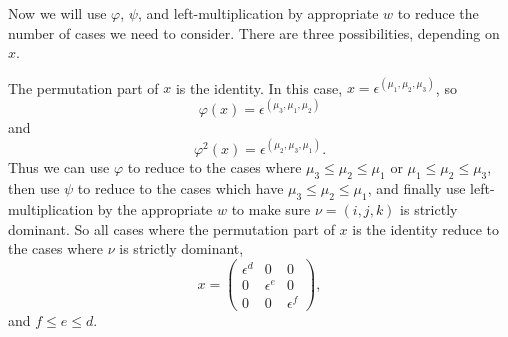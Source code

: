 \documentclass{amsart}
\theoremstyle{definition}
\def\e{\epsilon}
\def\phi{\varphi}
\newenvironment{caselist}
	       {\begin{list}{\underline{Case \arabic{enumi}}:}
		   {\usecounter{enumi}
		     \setlength{\itemindent}{0.5in}
		     \setlength{\leftmargin}{0in}
		     \setlength{\rightmargin}{0in}
	       }}
	       {\end{list}}
\begin{document}
  Now we will use $\phi$, $\psi$, and left-multiplication by appropriate $w$ to
  reduce the number of cases we need to consider.  There are three
  possibilities, depending on $x$.
  \begin{caselist}
    \item The permutation part of $x$ is the identity.  In this case, $x =
      \e^{(\mu_1,\mu_2,\mu_3)}$, so
      \begin{equation*}
        \phi(x) = \e^{(\mu_3, \mu_1, \mu_2)}
      \end{equation*}
      and
      \begin{equation*}
        \phi^2(x) = \e^{(\mu_2, \mu_3, \mu_1)}.
      \end{equation*}
      Thus we can use $\phi$ to reduce to the cases where $\mu_3 \le \mu_2 \le
      \mu_1$ or $\mu_1 \le \mu_2 \le \mu_3$, then use $\psi$ to reduce to the
      cases which have $\mu_3 \le \mu_2 \le \mu_1$, and finally use
      left-multiplication by the appropriate $w$ to make sure $\nu = (i,j,k)$
      is strictly dominant.  So all cases where the permutation part of $x$ is
      the identity reduce to the cases where $\nu$ is strictly dominant,
      \begin{equation*}
        x = \begin{pmatrix}
          \e^d & 0 & 0 \\
          0 & \e^e & 0 \\
          0 & 0 & \e^f
        \end{pmatrix},
      \end{equation*}
      and $f \le e \le d$.


\end{caselist}
\end{document}
